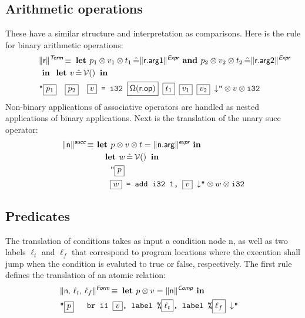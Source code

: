 \documentclass{article}
\newcommand{\trad}[2]{\ensuremath{\lVert \textsf{#1} \rVert^{\textit{#2}}}}
\newcommand{\nl}[0]{\ensuremath{\downarrow}}
\DeclareMathOperator{\isdef}{\equiv}
\DeclareMathOperator{\variable}{\mathcal{V}()}
\newcommand{\llvm}[1]{\texttt{#1}}
\newcommand{\B}[1]{\textsf{#1}}
\newcommand{\LET}[0]{\textbf{ let }}
\DeclareMathOperator{\BE}{\hat{=}}
\newcommand{\IN}[0]{\textbf{ in }}
\newcommand{\AND}[0]{\textbf{ and }}
\newcommand{\PH}[1]{\framebox{$#1$}}
\newcommand{\sep}[0]{\otimes}
\newcommand{\opmap}[0]{\ensuremath{\sf\Omega}}
\begin{document}
\subsection{Arithmetic operations} 

These have a similar structure and interpretation as comparisons. Here
is the rule for binary arithmetic operations:
\begin{align*}
\lefteqn{\trad{r}{\B{Term}} \isdef
  \LET
  p_1 \sep v_1 \sep t_1 \BE \trad{r.arg1}{\B{Expr}} \AND
  p_2 \sep v_2 \sep t_2 \BE \trad{r.arg2}{\B{Expr}}} \\
& \IN \LET v \BE \variable \IN \\
& \llvm{"\PH{p_1}\quad\PH{p_2}\quad\PH{v} = i32 \PH{\opmap(\B{r.op})} \PH{t_1} \PH{v_1} \PH{v_2} \nl"} \sep v \sep \llvm{i32}
\end{align*}
Non-binary applications of associative operators are handled as nested
applications of binary applications. Next is the translation of the unary
\B{succ} operator:
\begin{align*}
  \trad{n}{\B{succ}} \isdef & \textbf{ let } p \sep v \sep t = \trad{n.arg}{\B{expr}} \IN  \\
  & \quad \LET w \BE \variable \IN \\
  & \quad \quad \llvm{"\PH{p}} \\
  & \quad \quad \llvm{\PH{w} = add i32 1, \PH{v} \nl"} \sep w \sep \llvm{i32}
\end{align*}

\subsection{Predicates}

The translation of conditions takes as input a condition node \B{n}, as well as
two labels $\ell_t$ and $\ell_f$ that correspond to program locations where the
execution shall jump when the condition is evaluted to true or false,
respectively.  The first rule defines the translation of an atomic relation:
\begin{align*}
  \lefteqn{\trad{n, $\ell_t$, $\ell_f$}{\B{Form}} \isdef
  \textbf{ let } p \sep v = \trad{n}{\B{Comp}} \IN} \\
  & \llvm{"\PH{p} \quad br i1 \PH{v}, label \%\PH{\ell_t}, label \%\PH{\ell_f} \nl"}
\end{align*}
\end{document}
